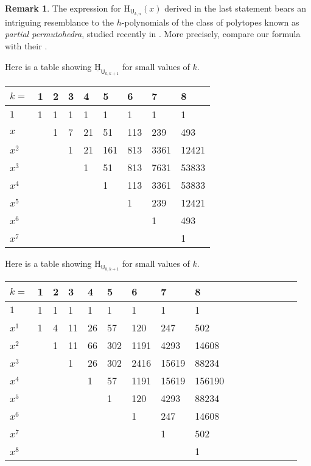 \documentclass[11pt, a4paper, english]{amsart}
\theoremstyle{teoremas}
\theoremstyle{definition}
\newtheorem{remark}[theorem]{Remark}
\newcommand{\U}{\mathsf{U}}
\renewcommand{\H}{\mathrm{H}}
\newcommand{\uH}{\underline{\mathrm{H}}}
\begin{document}
\begin{remark}
   The expression for $\H_{\U_{k,n}}(x)$ derived in the last statement bears an intriguing resemblance to the $h$-polynomials of the class of polytopes known as \emph{partial permutohedra}, studied recently in \cite{partial-permutohedra}. More precisely, compare our formula with their \cite[Theorem~3.17]{partial-permutohedra}.
\end{remark}

\iffalse


Here is a table showing $\uH_{\U_{k,k+1}}$ for small values of $k$.

\begin{center}
\begin{tabular}{l l l l l l l l l}\hline
$k=$      & 1   & 2 & 3 & 4 & 5 & 6 & 7 & 8 \\ \hline
 $1$      & 1   & 1  & 1  & 1  & 1  & 1  & 1  & 1 \\
 $x$      &     & 1  & 7  & 21  & 51  &  113 & 239 & 493 \\
 $x^2$    &     &   &  1   & 21  & 161  & 813  & 3361 & 12421  \\
 $x^3$    &     &   &     & 1  & 51  & 813  & 7631  & 53833  \\
 $x^4$    &     &   &     &    &  1  & 113  & 3361  & 53833  \\
 $x^5$    &     &   &   &   &   &  1&  239  & 12421 \\
 $x^6$    &     &   &   &   &   &   &   1& 493  \\
 $x^7$    &     &   &   &   &   &   &   &  1  \\
\end{tabular}
\end{center}

Here is a table showing $\H_{\U_{k,k+1}}$ for small values of $k$.

\begin{center}
\begin{tabular}{l l l l l l l l l l l l l l l l}\hline
$k=$   & 1   & 2 & 3 & 4 & 5 & 6 & 7 & 8  \\ \hline
$1$  & 1 & 1 & 1 & 1 & 1 & 1 & 1 & 1\\
$x^1$  & 1 & 4 & 11 & 26 & 57 & 120 & 247 & 502\\
$x^2$  &  & 1 & 11 & 66 & 302 & 1191 & 4293 & 14608\\
$x^3$  &  &  & 1 & 26 & 302 & 2416 & 15619 & 88234\\
$x^4$  &  &  &  & 1 & 57 & 1191 & 15619 & 156190\\
$x^5$  &  &  &  &  & 1 & 120 & 4293 & 88234\\
$x^6$  &  &  &  &  &  & 1 & 247 & 14608\\
$x^7$  &  &  &  &  &  &  & 1 & 502\\
$x^8$  &  &  &  &  &  &  &  & 1\\

\end{tabular}
\end{center}
\end{document}
